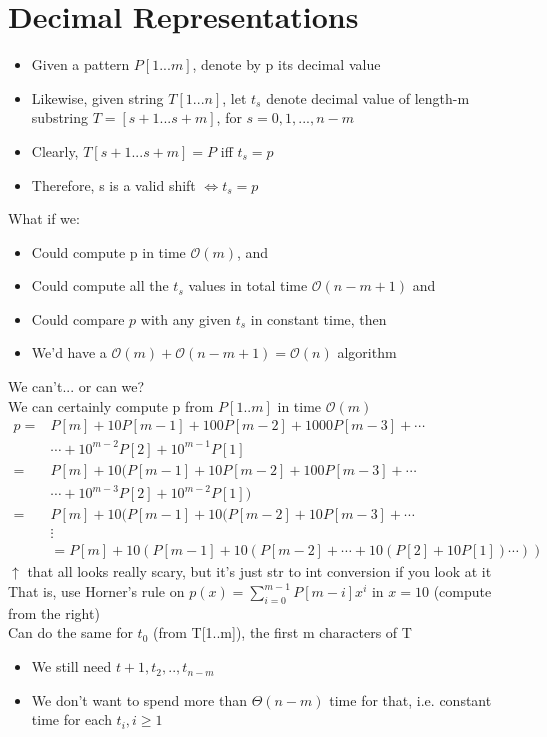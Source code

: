 \documentclass{article}[18pt]
\begin{document}
\section{Decimal Representations}
\begin{itemize}
	\item Given a pattern $P[1...m]$, denote by p its decimal value
	\item Likewise, given string $T[1...n]$, let $t_s$ denote decimal value of length-m substring $T=[s+1...s+m]$, for $s=0,1,...,n-m$
	\item Clearly, $T[s+1...s+m]=P$ iff $t_s=p$
	\item Therefore, s is a valid shift $\Leftrightarrow t_s=p$
\end{itemize}
What if we:
\begin{itemize}
	\item Could compute p in time $\mathcal{O}(m)$, and
	\item Could compute all the $t_s$ values in total time $\mathcal{O}(n-m+1)$ and
	\item Could compare $p$ with any given $t_s$ in constant time, then
	\item We'd have a $\mathcal{O}(m)+\mathcal{O}(n-m+1)=\mathcal{O}(n)$ algorithm
\end{itemize}
We can't... or can we?\\
We can certainly compute p from $P[1..m]$ in time $\mathcal{O}(m)$
\[ 
\begin{aligned} p=& P[m]+10 P[m-1]+100 P[m-2]+1000 P[m-3]+\cdots \\ & \cdots+10^{m-2} P[2]+10^{m-1} P[1] \\=& P[m]+10(P[m-1]+10 P[m-2]+100 P[m-3]+\cdots\\ & \cdots+10^{m-3} P[2]+10^{m-2} P[1] ) \\=& P[m]+10(P[m-1]+10(P[m-2]+10 P[m-3]+\cdots\\ & \vdots \\ &=P[m]+10(P[m-1]+10(P[m-2]+\cdots+10(P[2]+10 P[1]) \cdots)) \end{aligned}
\]
$\uparrow$ that all looks really scary, but it's just str to int conversion if you look at it\\
That is, use Horner's rule on $p(x)=\sum_{i=0}^{m-1}P[m-i]x^i$ in $x=10$ (compute from the right)\\
Can do the same for $t_0$ (from T[1..m]), the first m characters of T
\begin{itemize}
	\item We still need $t+1,t_2,..,t_{n-m}$
	\item We don't want to spend more than $\Theta(n-m)$ time for that, i.e. constant time for each $t_i, i\geqslant 1$
\end{itemize}
\end{document}

